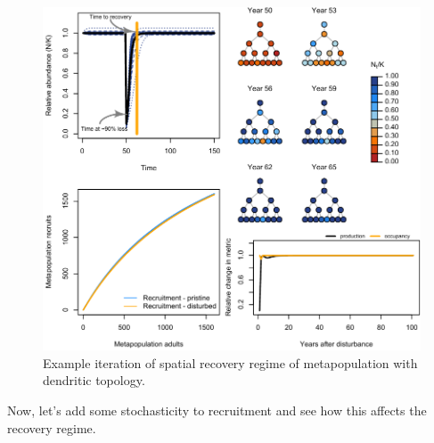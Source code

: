 \documentclass[
]{article}
\begin{document}
\begin{figure}[H]

{\centering \includegraphics{Managing_for_ecological_surprises_in_metapopulations_files/figure-latex/example results2-1} 

}

\caption{Example iteration of spatial recovery regime of metapopulation with dendritic topology.}\label{fig:example results2}
\end{figure}
\newpage

Now, let's add some stochasticity to recruitment and see how this
affects the recovery regime.
\end{document}
